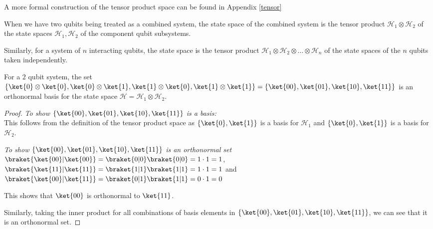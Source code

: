 \begin{note}
    A more formal construction of the tensor product space can be found in Appendix \ref{tensor}
\end{note}



\begin{samepage}
    \begin{mdframed}
\begin{axiom}
When we have two qubits being treated as a combined system, the state space of the combined system is the tensor product $\mathcal{H}_1 \otimes \mathcal{H}_2$ of the state spaces $\mathcal{H}_1, \mathcal{H}_2$ of the component qubit subsystems. 

    Similarly, for a system of $n$ interacting qubits, the state space is the tensor product $\mathcal{H}_1 \otimes \mathcal{H}_2 \otimes ... \otimes \mathcal{H}_n$ of the state spaces of the $n$ qubits taken independently.
\end{axiom}
    \end{mdframed}
\end{samepage}


\begin{prop}
    For a $2$ qubit system, the set $\{ \ket{0} \otimes \ket{0}, \ket{0} \otimes \ket{1}, \ket{1} \otimes \ket{0}, \ket{1} \otimes \ket{1} \} = \{ \ket{00}, \ket{01}, \ket{10}, \ket{11} \}$ is an orthonormal basis for the state space $\mathcal{H} = \mathcal{H}_1 \otimes \mathcal{H}_2$.
\end{prop}
\begin{proof}
    \emph{To show  $\{ \ket{00}, \ket{01}, \ket{10}, \ket{11} \}$ is a basis: } \\

    This follows from the definition of the tensor product space as $\{ \ket{0}, \ket{1} \}$ is a basis for $\mathcal{H}_1$ and $\{ \ket{0}, \ket{1} \}$ is a basis for $\mathcal{H}_2$.

    \emph{To show $\{ \ket{00}, \ket{01}, \ket{10}, \ket{11} \}$ is an orthonormal set} \\
    $\braket{ \ket{00} | \ket{00}} = \braket{0|0} \braket{0|0} = 1 \cdot 1 = 1$, 
    $\braket{ \ket{11} | \ket{11}} = \braket{1|1} \braket{1|1} = 1 \cdot 1 = 1$
    and $\braket{ \ket{00} | \ket{11}} = \braket{0|1} \braket{1|1} = 0 \cdot 1 = 0$

    This shows that $\ket{00}$ is orthonormal to $\ket{11}$. 

    Similarly, taking the inner product for all combinations of basis elements in $\{ \ket{00}, \ket{01}, \ket{10}, \ket{11} \}$, we can see that it is an orthonormal set.
\end{proof}

